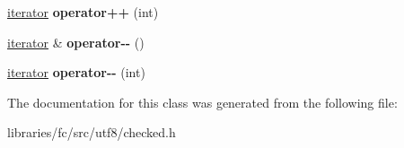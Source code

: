 \begin{DoxyCompactItemize}
\mbox{\label{classutf8_1_1iterator_aa21c39e32e3bf53c08d8ee5cde280671}} 
\mbox{\hyperlink{classutf8_1_1iterator}{iterator}} {\bfseries operator++} (int)
\item 
\mbox{\label{classutf8_1_1iterator_a7781099a85323b5a3ff4dc1015ca5af0}} 
\mbox{\hyperlink{classutf8_1_1iterator}{iterator}} \& {\bfseries operator-\/-\/} ()
\item 
\mbox{\label{classutf8_1_1iterator_afc228985ba672a6b6966ea0a705a4755}} 
\mbox{\hyperlink{classutf8_1_1iterator}{iterator}} {\bfseries operator-\/-\/} (int)
\end{DoxyCompactItemize}


The documentation for this class was generated from the following file\+:\begin{DoxyCompactItemize}
\item 
libraries/fc/src/utf8/checked.\+h\end{DoxyCompactItemize}
